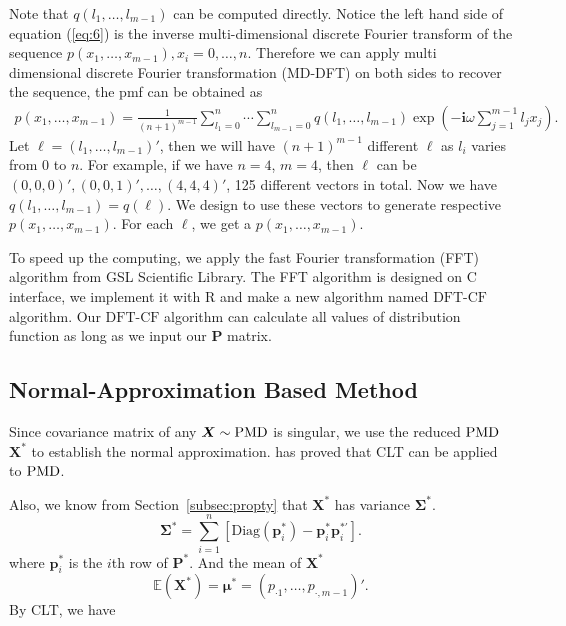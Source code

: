 \documentclass[12pt]{article}
\newcommand{\Sigmavec}{{\boldsymbol{\Sigma}}}
\newcommand{\EE}{\mathbb{E}}
\newcommand{\Pmat}{\mathbf{P}}
\newcommand{\pvec}{\boldsymbol{p}}
\newcommand{\ivec}{{\boldsymbol{i}}}
\newcommand{\diag}{\textrm{Diag}}
\newcommand{\PMD}{{\normalfont\textrm{PMD}}}
\newcommand{\Xvec}{\boldsymbol{X}}
\newcommand{\muvec}{\boldsymbol{\mu}}
\newcommand{\Sig}{\boldsymbol{\Sigma}}
\newcommand{\dft}{{\textrm{DFT-CF}}}
\begin{document}
Note that $q(l_1, \ldots, l_{m-1})$ can be computed directly. Notice the left hand side of equation (\ref{eq:6}) is the inverse multi-dimensional discrete Fourier transform of the sequence $ p(x_1,\ldots,x_{m-1}), x_i = 0 , \dots, n$. Therefore we can apply multi dimensional discrete Fourier transformation (MD-DFT) on both sides to recover the sequence, the pmf can be obtained as
\begin{align}\label{eq:7}
p(x_1, \ldots, x_{m-1}) = \frac{1}{(n+1)^{m-1}}\sum_{l_1 = 0}^{n}\cdots \sum_{l_{m-1} = 0}^n q(l_1, \ldots, l_{m-1}) \exp\left(-\ivec\omega\sum_{j=1}^{m-1}l_j x_j\right).
\end{align}
Let $\ell = (l_1,\dots,l_{m-1})'$, then we will have $(n
+1)^{m-1}$ different $\ell$ as $l_i$ varies from $0$ to $n$. For example, if we have $n=4$, $m=4$, then $\ell$ can be $(0, 0, 0)', (0, 0, 1)', \dots, (4, 4, 4)'$, 125 different vectors in total. Now we have $q(l_1,\dots,l_{m-1}) = q(\ell)$. We design to use these vectors to generate respective $p(x_1,\dots,x_{m-1})$. For each $\ell$, we get a $p(x_1,\dots,x_{m-1})$.

To speed up the computing, we apply the fast Fourier transformation (FFT) algorithm  from GSL Scientific Library. The FFT algorithm is designed on C interface, we implement it with R and make a new algorithm named $\dft$ algorithm. Our $\dft$ algorithm can calculate all values of distribution function as long as we input our $\Pmat$ matrix.



\subsection{Normal-Approximation Based Method}
Since covariance matrix of any $\Xvec \sim \PMD$ is singular, we use the reduced $\PMD$ $\Xvec^{\ast}$ to establish the normal approximation.   has proved that CLT can be applied to $\PMD$. 

Also, we know from Section~\ref{subsec:propty} that $\Xvec^{\ast}$ has variance  $\Sigmavec^{\ast}$. 
$$\Sig^{\ast}=\sum_{i=1}^n[\diag(\pvec_i^{\ast})-\pvec_i^{\ast} \pvec_i^{\ast \prime} ].$$
where $\pvec_i^{\ast}$ is the $i$th row of $\Pmat^{\ast}$. And the mean of $\Xvec^{\ast}$
  $$\EE(\Xvec^{\ast}) =\muvec^{\ast} = \left( p_{\cdot1} ,\dots,p_{\cdot,m-1}\right)'.$$
By CLT, we have 
 
\end{document}
